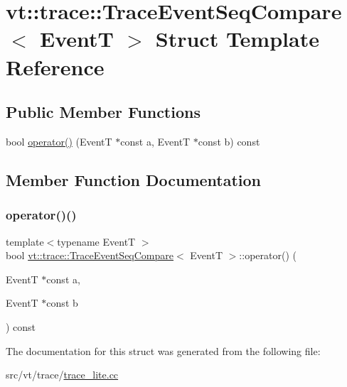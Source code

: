 \hypertarget{structvt_1_1trace_1_1_trace_event_seq_compare}{}\section{vt\+:\+:trace\+:\+:Trace\+Event\+Seq\+Compare$<$ EventT $>$ Struct Template Reference}
\label{structvt_1_1trace_1_1_trace_event_seq_compare}
\subsection*{Public Member Functions}
\begin{DoxyCompactItemize}
\item 
bool \hyperlink{structvt_1_1trace_1_1_trace_event_seq_compare_a74c92aa31dd3c4516bf4fb4b382db343}{operator()} (EventT $\ast$const a, EventT $\ast$const b) const
\end{DoxyCompactItemize}


\subsection{Member Function Documentation}
\mbox{\label{structvt_1_1trace_1_1_trace_event_seq_compare_a74c92aa31dd3c4516bf4fb4b382db343}} 
\subsubsection{\texorpdfstring{operator()()}{operator()()}}
{\footnotesize\ttfamily template$<$typename EventT $>$ \\
bool \hyperlink{structvt_1_1trace_1_1_trace_event_seq_compare}{vt\+::trace\+::\+Trace\+Event\+Seq\+Compare}$<$ EventT $>$\+::operator() (\begin{DoxyParamCaption}\item[{EventT $\ast$const}]{a,  }\item[{EventT $\ast$const}]{b }\end{DoxyParamCaption}) const\hspace{0.3cm}{\ttfamily [inline]}}



The documentation for this struct was generated from the following file\+:\begin{DoxyCompactItemize}
\item 
src/vt/trace/\hyperlink{trace__lite_8cc}{trace\+\_\+lite.\+cc}\end{DoxyCompactItemize}
